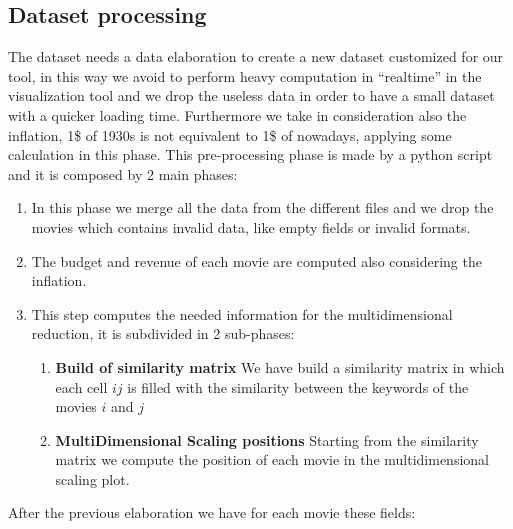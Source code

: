 \documentclass[]{article}
\newcommand{\quotes}[1]{``#1''}
\begin{document}
\subsection{Dataset processing}
The dataset needs a data elaboration to create a new dataset customized for our tool, in this way we avoid to perform heavy computation in \quotes{realtime} in the visualization tool and we drop the useless data in order to have a small dataset with a quicker loading time.\newline
Furthermore we take in consideration also the inflation, 1\$ of 1930s is not equivalent to 1\$ of nowadays, applying some calculation in this phase.\newline
This pre-processing phase is made by a python script and it is composed by 2 main phases:
\begin{enumerate}
	\item In this phase we merge all the data from the different files and we drop the movies which contains invalid data, like empty fields or invalid formats.
	\item The budget and revenue of each movie are computed also considering the inflation.
	\item This step computes the needed information for the multidimensional reduction, it is subdivided in 2 sub-phases:
	\begin{enumerate}
		\item \textbf{Build of similarity matrix}\newline
		 We have build a similarity matrix in which each cell $ij$ is filled with the similarity between the keywords of the movies $i$ and $j$
		\item \textbf{MultiDimensional Scaling positions}\newline
		Starting from the similarity matrix we compute the position of each movie in the multidimensional scaling plot.
	\end{enumerate}
\end{enumerate}
After the previous elaboration we have for each movie these fields:
\end{document}

